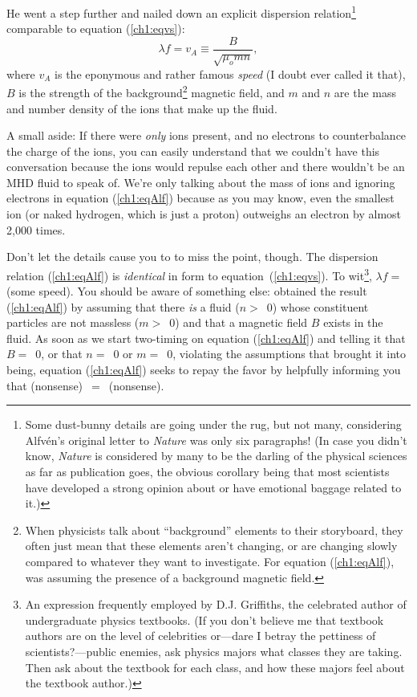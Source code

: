 He went a step further and nailed down an explicit dispersion
relation\footnote{Some dust-bunny details are going under the rug, but
  not many, considering Alfv\'{e}n's original letter to
  \textsl{Nature} was only six paragraphs! (In case you didn't know,
  \textsl{Nature} is considered by many to be the darling of the
  physical sciences as far as publication goes, the obvious corollary
  being that most scientists have developed a strong opinion about or
  have emotional baggage related to it.)} comparable to equation
(\ref{ch1:eqvs}):
\begin{equation}
  \label{ch1:eqAlf}
  \lambda f = v_A \equiv \frac{B}{\sqrt{\mu_o m n}},
\end{equation}
where $v_A$ is the eponymous and rather famous \textsl{\Alf speed} (I
doubt \Alf ever called it that), $B$ is the strength of the
background\footnote{When physicists talk about ``background'' elements
  to their storyboard, they often just mean that these elements aren't
  changing, or are changing slowly compared to whatever they want to
  investigate. For equation (\ref{ch1:eqAlf}), \Alf was assuming the
  presence of a background magnetic field.} magnetic field, and $m$
and $n$ are the mass and number density of the ions that make up the
fluid. 

A small aside: If there were \emph{only} ions present, and no
electrons to counterbalance the charge of the ions, you can easily
understand that we couldn't have this conversation because the ions
would repulse each other and there wouldn't be an MHD fluid to speak
of. We're only talking about the mass of ions and ignoring electrons
in equation (\ref{ch1:eqAlf}) because as you may know, even the
smallest ion (or naked hydrogen, which is just a proton) outweighs an
electron by almost 2,000 times.

Don't let the details cause you to to miss the point, though. The
dispersion relation (\ref{ch1:eqAlf}) is \emph{identical} in form to
equation~(\ref{ch1:eqvs}). To wit\footnote{An expression frequently
  employed by D.J. Griffiths, the celebrated author of undergraduate
  physics textbooks. (If you don't believe me that textbook authors
  are on the level of celebrities or---dare I betray the pettiness of
  scientists?---public enemies, ask physics majors what classes they
  are taking. Then ask about the textbook for each class, and how
  these majors feel about the textbook author.)}, $ \lambda f = $(some
speed). You should be aware of something else: \Alf obtained the
result (\ref{ch1:eqAlf}) by assuming that there \emph{is} a fluid ($n
>$~0) whose constituent particles are not massless ($m >$~0) and that
a magnetic field $B$ exists in the fluid. As soon as we start
two-timing on equation (\ref{ch1:eqAlf}) and telling it that $B =$~0,
or that $n =$~0 or $m =$~0, violating the assumptions that brought it
into being, equation (\ref{ch1:eqAlf}) seeks to repay the favor by
helpfully informing you that (nonsense)~$=$~(nonsense).

